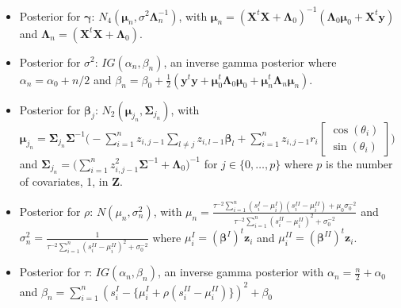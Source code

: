 \documentclass[12pt,]{article}
\begin{document}
\begin{enumerate}
\begin{itemize}
\item Posterior for $\boldsymbol{\gamma}$: $N_4(\boldsymbol{\mu}_n, \sigma^2\boldsymbol{\Lambda}^{-1}_n)$, with $\boldsymbol{\mu}_n = (\boldsymbol{X}^t\boldsymbol{X} + \boldsymbol{\Lambda}_0)^{-1}(\boldsymbol{\Lambda}_0\boldsymbol{\mu}_0 + \boldsymbol{X}^t\boldsymbol{y})$ and $\boldsymbol{\Lambda}_n = (\boldsymbol{X}^t\boldsymbol{X} + \boldsymbol{\Lambda}_0)$.
\item Posterior for $\sigma^2$: $IG(\alpha_{n}, \beta_{n})$, an inverse gamma posterior where $\alpha_{n} = \alpha_0 + n/2$ and $\beta_{n} = \beta_0 + \frac{1}{2}(\boldsymbol{y}^t\boldsymbol{y} + \boldsymbol{\mu}_{0}^t\boldsymbol{\Lambda}_0\boldsymbol{\mu}_{0} + \boldsymbol{\mu}_{n}^t\boldsymbol{\Lambda}_n\boldsymbol{\mu}_{n})$.
\item Posterior for $\boldsymbol{\beta}_j$: $N_2(\boldsymbol{\mu}_{j_{n}}, \boldsymbol{\Sigma}_{j_{n}})$, with $\boldsymbol{\mu}_{j_{n}} = \boldsymbol{\Sigma}_{j_{n}}\boldsymbol{\Sigma}^{-1}\Bigg(-\sum_{i=1}^{n}z_{i,j-1}\sum_{l\neq j}z_{i,l-1}\boldsymbol{\beta}_l + \sum_{i=1}^{n}z_{i,j-1}r_i\begin{bmatrix} \cos (\theta_i) \\ \sin (\theta_i)\end{bmatrix}\Bigg)$ and  $\boldsymbol{\Sigma}_{j_{n}} = \Big(\sum_{i=1}^{n}z_{i,j-1}^2\boldsymbol{\Sigma}^{-1}+\boldsymbol{\Lambda}_0\Big)^{-1}$ for $j \in \{0, \dots, p\}$ where $p$ is the number of covariates, 1, in $\boldsymbol{Z}$.
\item Posterior for $\rho$: $N(\mu_n, \sigma^2_n)$, with $\mu_n = \frac{\tau^{-2} \sum_{i=1}^{n}(s^{I}_{i} - \mu_i^{I})(s^{II}_{i} - \mu_i^{II}) + \mu_0\sigma_0^{-2}}{\tau^{-2}\sum_{i=1}^{n}(s^{II}_{i} - \mu_i^{II})^2 + \sigma_0^{-2}}$ and $\sigma_n^2 = \frac{1}{\tau^{-2}\sum_{i=1}^{n}(s^{II}_{i} - \mu_i^{II})^2 + \sigma_0^{-2}}$ where $\mu_i^{I} = (\boldsymbol{\beta}^{I})^t\boldsymbol{z}_i$ and $\mu_i^{II} = (\boldsymbol{\beta}^{II})^t\boldsymbol{z}_i$. 
\item Posterior for $\tau$: $IG(\alpha_n, \beta_n)$, an inverse gamma posterior with $\alpha_n = \frac{n}{2} + \alpha_0$ and $\beta_n = \sum\limits_{i = 1}^{n}(s^{I}_{i} - \{\mu_i^{I} + \rho(s^{II}_{i} - \mu_i^{II})\})^2 + \beta_0$
\end{itemize}


\end{enumerate}
\end{document}
